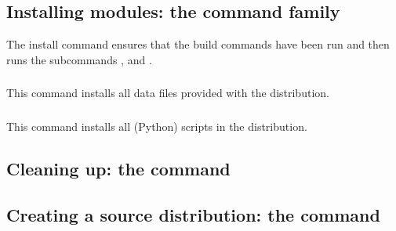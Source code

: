 \documentclass{howto}
\begin{document}
\subsection{Installing modules: the \protect{} command family}
\label{install-cmd}

The install command ensures that the build commands have been run and then
runs the subcommands ,
 and
.

\subsubsection{\protect{}}
\label{sec:install-lib-cmd}

\subsubsection{\protect{}}
\label{sec:install-data-cmd}
This command installs all data files provided with the distribution.

\subsubsection{\protect{}}
\label{sec:install-scripts-cmd}
This command installs all (Python) scripts in the distribution.


\subsection{Cleaning up: the \protect{} command}
\label{clean-cmd}


\subsection{Creating a source distribution: the \protect{} command}
\label{sdist-cmd}
\end{document}
